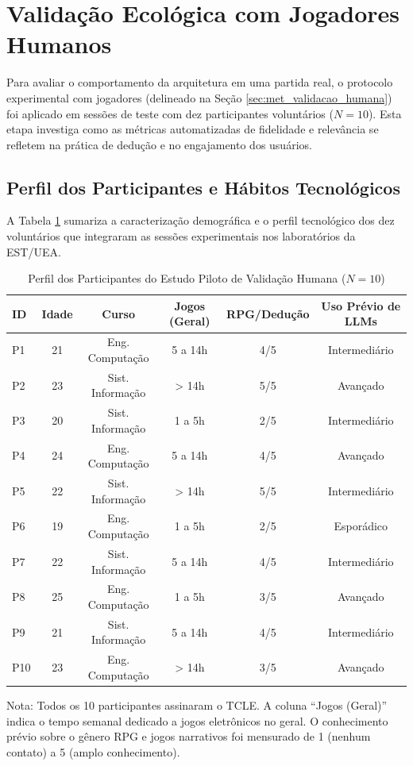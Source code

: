 \section{Validação Ecológica com Jogadores Humanos}
\label{sec:res_projecoes_humanas}

Para avaliar o comportamento da arquitetura em uma partida real, o protocolo experimental com jogadores (delineado na Seção \ref{sec:met_validacao_humana}) foi aplicado em sessões de teste com dez participantes voluntários ($N = 10$). Esta etapa investiga como as métricas automatizadas de fidelidade e relevância se refletem na prática de dedução e no engajamento dos usuários.

\subsection{Perfil dos Participantes e Hábitos Tecnológicos}
A Tabela \ref{tab:perfil_participantes} sumariza a caracterização demográfica e o perfil tecnológico dos dez voluntários que integraram as sessões experimentais nos laboratórios da EST/UEA.

\begin{table}[H]
\centering
\small
\caption{Perfil dos Participantes do Estudo Piloto de Validação Humana ($N = 10$)}
\label{tab:perfil_participantes}
\begin{tabularx}{\textwidth}{lccccc}
\toprule
\textbf{ID} & \textbf{Idade} & \textbf{Curso} & \textbf{Jogos (Geral)} & \textbf{RPG/Dedução} & \textbf{Uso Prévio de LLMs} \\
\midrule
P1 & 21 & Eng. Computação & 5 a 14h & 4/5 & Intermediário \\
P2 & 23 & Sist. Informação & > 14h & 5/5 & Avançado \\
P3 & 20 & Sist. Informação & 1 a 5h & 2/5 & Intermediário \\
P4 & 24 & Eng. Computação & 5 a 14h & 4/5 & Avançado \\
P5 & 22 & Sist. Informação & > 14h & 5/5 & Intermediário \\
P6 & 19 & Eng. Computação & 1 a 5h & 2/5 & Esporádico \\
P7 & 22 & Sist. Informação & 5 a 14h & 4/5 & Intermediário \\
P8 & 25 & Eng. Computação & 1 a 5h & 3/5 & Avançado \\
P9 & 21 & Sist. Informação & 5 a 14h & 4/5 & Intermediário \\
P10 & 23 & Eng. Computação & > 14h & 3/5 & Avançado \\
\bottomrule
\end{tabularx}
\footnotesize{Nota: Todos os 10 participantes assinaram o TCLE. A coluna ``Jogos (Geral)'' indica o tempo semanal dedicado a jogos eletrônicos no geral. O conhecimento prévio sobre o gênero RPG e jogos narrativos foi mensurado de 1 (nenhum contato) a 5 (amplo conhecimento).}
\end{table}

